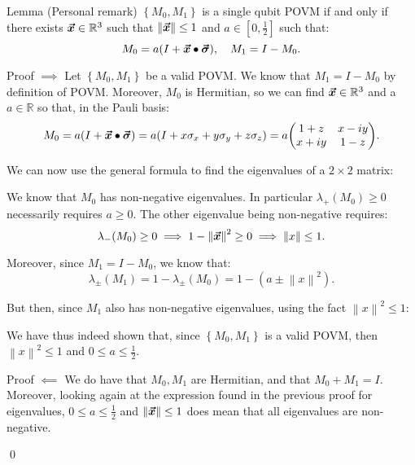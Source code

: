 \documentclass[a4paper]{article}
\begin{document}
\begin{parag}{Lemma (Personal remark)}
    $\left\{M_0, M_1\right\}$ is a single qubit POVM if and only if there exists $\bm{\protect\vec{x}} \in \mathbb{R}^3$ such that $\left\|\bvec{x}\right\| \leq 1$ and $a \in \left[0, \frac{1}{2}\right]$ such that: 
    \[M_0 = a \left(I + \bvec{x} \dotprod \bvec{\sigma}\right), \mathspace M_1 = I - M_0.\]
    
    \begin{subparag}{Proof $\implies$}
        Let $\left\{M_0, M_1\right\}$ be a valid POVM. We know that $M_1 = I - M_0$ by definition of POVM. Moreover, $M_0$ is Hermitian, so we can find $\bm{\protect\vec{x}} \in \mathbb{R}^3$ and a $a \in \mathbb{R}$ so that, in the Pauli basis: 
        \[M_0 = a \left(I + \bvec{x} \dotprod \bvec{\sigma}\right) = a\left(I + x \sigma_x + y \sigma_y + z \sigma_z\right) = a \begin{pmatrix} 1 + z & x - iy \\ x + iy & 1- z \end{pmatrix}.\]
        
        We can now use the general formula to find the eigenvalues of a $2\times 2$ matrix: 

        We know that $M_0$ has non-negative eigenvalues. In particular $\lambda_+\left(M_0\right) \geq 0$ necessarily requires $a \geq 0$. The other eigenvalue being non-negative requires:
        \[\lambda_{-}\left(M_0\right) \geq 0 \implies 1 - \left\|\bvec{x}\right\|^2 \geq 0 \implies \left\|x\right\| \leq 1.\]

        Moreover, since $M_1 = I - M_0$, we know that: 
        \[\lambda_{\pm}\left(M_1\right) = 1 - \lambda_{\pm}\left(M_0\right) = 1 - \left(a \pm \left\|x\right\|^2\right).\]
        
        But then, since $M_1$ also has non-negative eigenvalues, using the fact $\left\|x\right\|^2 \leq 1$: 
        
        We have thus indeed shown that, since $\left\{M_0, M_1\right\}$ is a valid POVM, then $\left\|x\right\|^2 \leq 1$ and $0 \leq a \leq \frac{1}{2}$.
    \end{subparag}

    \begin{subparag}{Proof $\impliedby$}
        We do have that $M_0, M_1$ are Hermitian, and that $M_0 + M_1 = I$. Moreover, looking again at the expression found in the previous proof for eigenvalues, $0 \leq a \leq \frac{1}{2}$ and $\left\|\bvec{x}\right\| \leq 1$ does mean that all eigenvalues are non-negative.

        \qed
    \end{subparag}
\end{parag}
\end{document}
